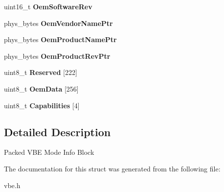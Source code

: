 \begin{DoxyCompactItemize}
\hypertarget{struct____attribute_____a133984a56ec19abf4fcb2e6ae71d6498}{}\label{struct____attribute_____a133984a56ec19abf4fcb2e6ae71d6498} 
uint16\+\_\+t {\bfseries Oem\+Software\+Rev}
\item 
\hypertarget{struct____attribute_____affd3a330afde841405f89bbcd05af4f0}{}\label{struct____attribute_____affd3a330afde841405f89bbcd05af4f0} 
phys\+\_\+bytes {\bfseries Oem\+Vendor\+Name\+Ptr}
\item 
\hypertarget{struct____attribute_____afd3d28c2078a683b1ed64ea21905fcfe}{}\label{struct____attribute_____afd3d28c2078a683b1ed64ea21905fcfe} 
phys\+\_\+bytes {\bfseries Oem\+Product\+Name\+Ptr}
\item 
\hypertarget{struct____attribute_____a239cba41d0489da5b79556b45797c6b0}{}\label{struct____attribute_____a239cba41d0489da5b79556b45797c6b0} 
phys\+\_\+bytes {\bfseries Oem\+Product\+Rev\+Ptr}
\item 
\hypertarget{struct____attribute_____a227f1952f057d99cf1aba11da9f56c70}{}\label{struct____attribute_____a227f1952f057d99cf1aba11da9f56c70} 
uint8\+\_\+t {\bfseries Reserved} \mbox{[}222\mbox{]}
\item 
\hypertarget{struct____attribute_____a294a9a10b723dc3ac2594fe05c4a1202}{}\label{struct____attribute_____a294a9a10b723dc3ac2594fe05c4a1202} 
uint8\+\_\+t {\bfseries Oem\+Data} \mbox{[}256\mbox{]}
\item 
\hypertarget{struct____attribute_____a555521aede0ff448231fc7a404862bdb}{}\label{struct____attribute_____a555521aede0ff448231fc7a404862bdb} 
uint8\+\_\+t {\bfseries Capabilities} \mbox{[}4\mbox{]}
\end{DoxyCompactItemize}


\subsection{Detailed Description}
Packed V\+BE Mode Info Block 

The documentation for this struct was generated from the following file\+:\begin{DoxyCompactItemize}
\item 
vbe.\+h\end{DoxyCompactItemize}
